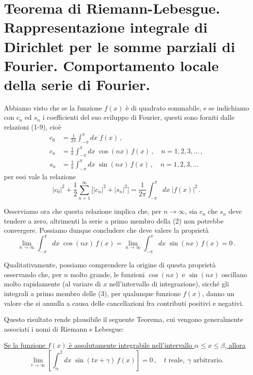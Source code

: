 \documentclass[11pt, a4paper]{book}
\numberwithin{equation}{section}
\begin{document}
\section{Teorema di Riemann-Lebesgue. Rappresentazione integrale di Dirichlet per le somme parziali di Fourier. Comportamento locale della serie di Fourier.}

Abbiamo visto che se la funzione $f(x)$ è di quadrato sommabile, e se indichiamo con $c_n$ ed $s_n$ i coefficienti del suo sviluppo di Fourier, questi sono forniti dalle relazioni (1-9), cioè
\begin{align}
  c_0 &= \frac{1}{2\pi}\int_{-\pi}^{\pi} dx\;f(x)\,, \tag{1a}\\
  c_n &= \frac{1}{\pi}\int_{-\pi}^{\pi} dx\;\cos(nx)\,f(x)\,,\quad n=1,2,3,\ldots\,, \tag{1b}\\
  s_n &= \frac{1}{\pi}\int_{-\pi}^{\pi} dx\;\sin(nx)\,f(x)\,,\quad n=1,2,3,\ldots \tag{1c}
\end{align}
per essi vale la relazione
\begin{equation}
  |c_0|^2 + \frac{1}{2}\sum_{n=1}^{\infty}\bigl[|c_n|^2+|s_n|^2\bigr]
  = \frac{1}{2\pi}\int_{-\pi}^{\pi} dx\;|f(x)|^2\,. \tag{2}
\end{equation}

Osserviamo ora che questa relazione implica che, per $n\to\infty$, sia $c_n$ che $s_n$ deve tendere a zero, altrimenti la serie a primo membro della (2) non potrebbe convergere. Possiamo dunque concludere che deve valere la proprietà
\begin{equation}
  \lim_{n\to\infty}\int_{-\pi}^{\pi} dx\;\cos(nx)\,f(x)
  = \lim_{n\to\infty}\int_{-\pi}^{\pi} dx\;\sin(nx)\,f(x) = 0\,. \tag{3}
\end{equation}

Qualitativamente, possiamo comprendere la origine di questa proprietà osservando che, per $n$ molto grande, le funzioni $\cos(nx)$ e $\sin(nx)$ oscillano molto rapidamente (al variare di $x$ nell'intervallo di integrazione), sicché gli integrali a primo membro delle (3), per qualunque funzione $f(x)$, danno un valore che si annulla a causa delle cancellazioni fra contributi positivi e negativi.

Questo risultato rende plausibile il seguente Teorema, cui vengono generalmente associati i nomi di Riemann e Lebesgue:

\underline{Se la funzione $f(x)$ è assolutamente integrabile nell'intervallo $\alpha \leq x \leq \beta$, allora}
\begin{equation}
  \lim_{t\to\infty}\left[\int_\alpha^\beta dx\;\sin(tx+\gamma)\,f(x)\right] = 0\,,
  \quad t \text{ reale},\; \gamma \text{ arbitrario.} \tag{4}
\end{equation}
\end{document}
